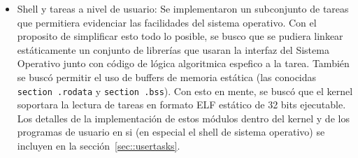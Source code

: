 \begin{itemize}
	\item Shell y tareas a nivel de usuario: Se implementaron un subconjunto de tareas que permitiera evidenciar las facilidades
	del sistema operativo. Con el proposito de simplificar esto todo lo posible, se busco que se pudiera linkear est\'aticamente
	un conjunto de librer\'ias que usaran la interfaz del Sistema Operativo junto con c\'odigo de l\'ogica algoritmica espefico a la
	tarea. Tambi\'en se busc\'o permitir el uso de buffers de memoria est\'atica (las conocidas 
	\texttt{section .rodata} y \texttt{section .bss}). Con esto en mente, se busc\'o que el kernel soportara la lectura de tareas en
	formato ELF est\'atico de 32 bits ejecutable. Los detalles de la implementaci\'on de estos m\'odulos dentro del kernel y de los
	programas de usuario en si (en especial el shell de sistema operativo) se incluyen en la secci\'on~\ref{sec::usertasks}.

\end{itemize}
